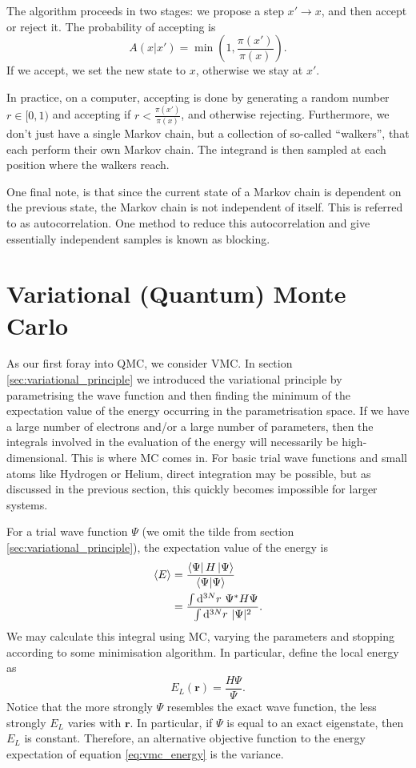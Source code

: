 The algorithm proceeds in two stages: we propose a step $x'\to x$, and then accept or reject it. The probability of accepting is
\begin{equation}
    A(x|x') = \min\left(1,\frac{\pi(x')}{\pi(x)}\right).
\end{equation}
If we accept, we set the new state to $x$, otherwise we stay at $x'$.

In practice, on a computer, accepting is done by generating a random number $r\in [0,1)$ and accepting if $r<\frac{\pi(x')}{\pi(x)}$, and otherwise rejecting. Furthermore, we don't just have a single Markov chain, but a collection of so-called ``walkers'', that each perform their own Markov chain. The integrand is then sampled at each position where the walkers reach.

One final note, is that since the current state of a Markov chain is dependent on the previous state, the Markov chain is not independent of itself. This is referred to as autocorrelation. One method to reduce this autocorrelation and give essentially independent samples is known as blocking.\supercite{flyvbjergError1989}

\section{Variational (Quantum) Monte Carlo}
\label{sec:vmc}

As our first foray into \gls{QMC}, we consider \gls{VMC}. In section \ref{sec:variational_principle} we introduced the variational principle by parametrising the wave function and then finding the minimum of the expectation value of the energy occurring in the parametrisation space. If we have a large number of electrons and/or a large number of parameters, then the integrals involved in the evaluation of the energy will necessarily be high-dimensional. This is where \gls{MC} comes in. For basic trial wave functions and small atoms like Hydrogen or Helium, direct integration may be possible, but as discussed in the previous section, this quickly becomes impossible for larger systems.

For a trial wave function $\Psi$ (we omit the tilde from section \ref{sec:variational_principle}), the expectation value of the energy is
\begin{align}
    \label{eq:vmc_energy}
    \langle E \rangle &= \frac{\bra{\Psi}H\ket{\Psi}}{\bra{\Psi}\ket{\Psi}} \\
    &= \frac{\int\mathrm{d}^{3N}r\ \Psi^*H\Psi}{\int\mathrm{d}^{3N}r\ |\Psi|^2}.
\end{align}
We may calculate this integral using \gls{MC}, varying the parameters and stopping according to some minimisation algorithm. In particular, define the local energy as
\begin{equation}
    E_L(\bm r) = \frac{H\Psi}{\Psi}.
\end{equation}
Notice that the more strongly $\Psi$ resembles the exact wave function, the less strongly $E_L$ varies with $\bm r$. In particular, if $\Psi$ is equal to an exact eigenstate, then $E_L$ is constant. Therefore, an alternative objective function to the energy expectation of equation \ref{eq:vmc_energy} is the variance.\supercite{cuzzocreaVariational2020,snajdrAre2000,kentMonte1999}

